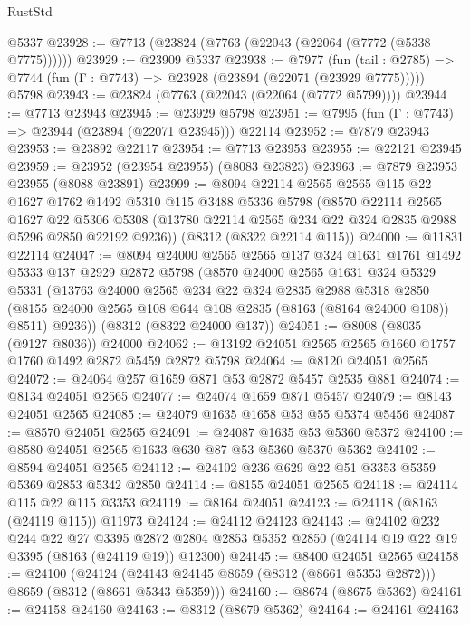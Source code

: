 \begin{lexlean}{RustStd}
\begin{coremodule}
    @5337
@23928 := @7713 (@23824 (@7763 (@22043 (@22064 (@7772 (@5338 @7775))))))
@23929 := @23909 @5337
@23938 := @7977
    (fun (tail : @2785) => @7744 (fun (Γ : @7743) => @23928 (@23894 (@22071 (@23929 @7775)))))
    @5798
@23943 := @23824 (@7763 (@22043 (@22064 (@7772 @5799))))
@23944 := @7713 @23943
@23945 := @23929 @5798
@23951 := @7995 (fun (Γ : @7743) => @23944 (@23894 (@22071 @23945))) @22114
@23952 := @7879 @23943
@23953 := @23892 @22117
@23954 := @7713 @23953
@23955 := @22121 @23945
@23959 := @23952 (@23954 @23955) (@8083 @23823)
@23963 := @7879 @23953 @23955 (@8088 @23891)
@23999 := @8094
    @22114
    @2565
    @2565
    @115
    @22
    @1627
    @1762
    @1492
    @5310
    @115
    @3488
    @5336
    @5798
    (@8570
      @22114
      @2565
      @1627
      @22
      @5306
      @5308
      (@13780 @22114 @2565 @234 @22 @324 @2835 @2988 @5296 @2850 @22192 @9236))
    (@8312 (@8322 @22114 @115))
@24000 := @11831 @22114
@24047 := @8094
    @24000
    @2565
    @2565
    @137
    @324
    @1631
    @1761
    @1492
    @5333
    @137
    @2929
    @2872
    @5798
    (@8570
      @24000
      @2565
      @1631
      @324
      @5329
      @5331
      (@13763
        @24000
        @2565
        @234
        @22
        @324
        @2835
        @2988
        @5318
        @2850
        (@8155 @24000 @2565 @108 @644 @108 @2835 (@8163 (@8164 @24000 @108)) @8511)
        @9236))
    (@8312 (@8322 @24000 @137))
@24051 := @8008 (@8035 (@9127 @8036)) @24000
@24062 := @13192 @24051 @2565 @2565 @1660 @1757 @1760 @1492 @2872 @5459 @2872 @5798
@24064 := @8120 @24051 @2565
@24072 := @24064 @257 @1659 @871 @53 @2872 @5457 @2535 @881
@24074 := @8134 @24051 @2565
@24077 := @24074 @1659 @871 @5457
@24079 := @8143 @24051 @2565
@24085 := @24079 @1635 @1658 @53 @55 @5374 @5456
@24087 := @8570 @24051 @2565
@24091 := @24087 @1635 @53 @5360 @5372
@24100 := @8580 @24051 @2565 @1633 @630 @87 @53 @5360 @5370 @5362
@24102 := @8594 @24051 @2565
@24112 := @24102 @236 @629 @22 @51 @3353 @5359 @5369 @2853 @5342 @2850
@24114 := @8155 @24051 @2565
@24118 := @24114 @115 @22 @115 @3353
@24119 := @8164 @24051
@24123 := @24118 (@8163 (@24119 @115)) @11973
@24124 := @24112 @24123
@24143 := @24102
    @232
    @244
    @22
    @27
    @3395
    @2872
    @2804
    @2853
    @5352
    @2850
    (@24114 @19 @22 @19 @3395 (@8163 (@24119 @19)) @12300)
@24145 := @8400 @24051 @2565
@24158 := @24100
    (@24124 (@24143 @24145 @8659 (@8312 (@8661 @5353 @2872))) @8659 (@8312 (@8661 @5343 @5359)))
@24160 := @8674 (@8675 @5362)
@24161 := @24158 @24160
@24163 := @8312 (@8679 @5362)
@24164 := @24161 @24163

\end{coremodule}
\end{lexlean}
